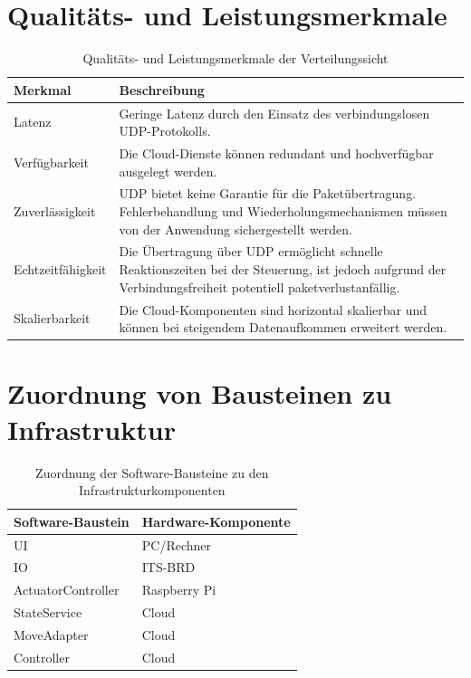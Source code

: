 \clearpage
\section{Qualitäts- und Leistungsmerkmale}
\begin{table}[h!]
\centering
\begin{tabular}{|l|p{10cm}|}
\hline
\textbf{Merkmal} & \textbf{Beschreibung} \\ \hline
Latenz & Geringe Latenz durch den Einsatz des verbindungslosen UDP-Protokolls. \\ \hline
Verfügbarkeit & Die Cloud-Dienste können redundant und hochverfügbar ausgelegt werden. \\ \hline
Zuverlässigkeit & UDP bietet keine Garantie für die Paketübertragung. Fehlerbehandlung und Wiederholungsmechanismen müssen von der Anwendung sichergestellt werden. \\ \hline
Echtzeitfähigkeit & Die Übertragung über UDP ermöglicht schnelle Reaktionszeiten bei der Steuerung, ist jedoch aufgrund der Verbindungsfreiheit potentiell paketverlustanfällig. \\ \hline
Skalierbarkeit & Die Cloud-Komponenten sind horizontal skalierbar und können bei steigendem Datenaufkommen erweitert werden. \\ \hline
\end{tabular}
\caption{Qualitäts- und Leistungsmerkmale der Verteilungssicht}
\end{table}

\section{Zuordnung von Bausteinen zu Infrastruktur}

\begin{table}[h!]
\centering
\begin{tabular}{|l|l|}
\hline
\textbf{Software-Baustein} & \textbf{Hardware-Komponente} \\ \hline
UI & PC/Rechner \\ \hline
IO & ITS-BRD \\ \hline
ActuatorController & Raspberry Pi \\ \hline
StateService & Cloud \\ \hline
MoveAdapter & Cloud \\ \hline
Controller & Cloud \\ \hline
\end{tabular}
\caption{Zuordnung der Software-Bausteine zu den Infrastrukturkomponenten}
\end{table}

